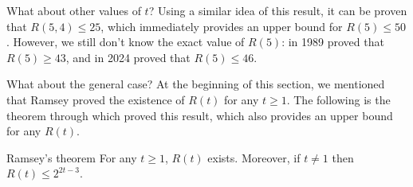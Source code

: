 \documentclass[a4paper, 12pt]{report}
\begin{document}
    What about other values of $t$? Using a similar idea of this result, it can be proven that $R(5, 4) \le 25$, which immediately provides an upper bound for $R(5) \le 50$. However, we still don't know the exact value of $R(5)$: in 1989 \textcite{exoo} proved that $R(5) \ge 43$, and in 2024 \textcite{angeltveit} proved that $R(5) \le 46$.

    What about the general case? At the beginning of this section, we mentioned that Ramsey proved the existence of $R(t)$ for any $t \ge 1$. The following is the theorem through which proved this result, which also provides an upper bound for any $R(t)$.

    \begin{framedthm}{Ramsey's theorem}
        For any $t \ge 1$, $R(t)$ exists. Moreover, if $t \neq 1$ then $R(t) \le 2^{2t - 3}$.
    \end{framedthm}
    
\end{document}
